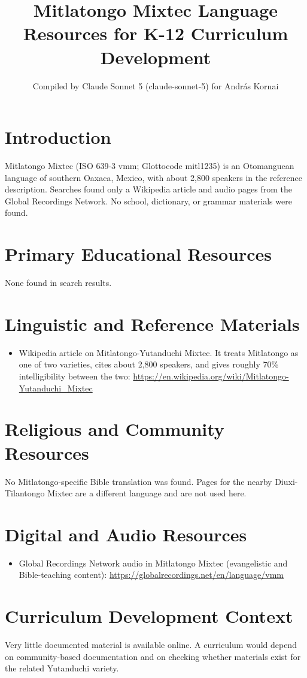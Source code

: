 \documentclass[12pt]{article}
\title{Mitlatongo Mixtec Language Resources for K-12 Curriculum Development}
\author{Compiled by Claude Sonnet 5 (claude-sonnet-5) for Andr\'as Kornai}
\date{}
\begin{document}
\maketitle

\section{Introduction}
Mitlatongo Mixtec (ISO 639-3 vmm; Glottocode mitl1235) is an Otomanguean language of southern Oaxaca, Mexico, with about 2,800 speakers in the reference description. Searches found only a Wikipedia article and audio pages from the Global Recordings Network. No school, dictionary, or grammar materials were found.

\section{Primary Educational Resources}
None found in search results.

\section{Linguistic and Reference Materials}
\begin{itemize}
\item Wikipedia article on Mitlatongo-Yutanduchi Mixtec. It treats Mitlatongo as one of two varieties, cites about 2,800 speakers, and gives roughly 70\% intelligibility between the two: \url{https://en.wikipedia.org/wiki/Mitlatongo-Yutanduchi_Mixtec}
\end{itemize}

\section{Religious and Community Resources}
No Mitlatongo-specific Bible translation was found. Pages for the nearby Diuxi-Tilantongo Mixtec are a different language and are not used here.

\section{Digital and Audio Resources}
\begin{itemize}
\item Global Recordings Network audio in Mitlatongo Mixtec (evangelistic and Bible-teaching content): \url{https://globalrecordings.net/en/language/vmm}
\end{itemize}

\section{Curriculum Development Context}
Very little documented material is available online. A curriculum would depend on community-based documentation and on checking whether materials exist for the related Yutanduchi variety.
\end{document}
